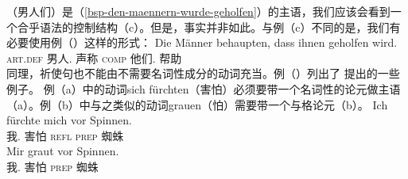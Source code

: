 （男人们）是（\ref{bsp-den-maennern-wurde-geholfen}）的主语，我们应该会看到一个合乎语法的控制结构（c）。但是，事实并非如此。与例（c）不同的是，我们有必要使用例（）这样的形式：
\ea
\gll Die Männer behaupten, dass ihnen geholfen wird.\\
	 \textsc{art}.\textsc{def} 男人.\nom{} 声称 \textsc{comp} 他们.\dat{} 帮助 \passiveprs\\
\z
%
同理，祈使句也不能由不需要名词性成分的动词充当。例（）列出了 \citet[]{Reis82}提出的一些例子。
\eal
{}
\zl
例（a）中的动词sich fürchten（害怕）必须要带一个名词性的论元做主语（a）。例（b）中与之类似的动词grauen（怕）需要带一个与格论元（b）。
\eal
\ex
\gll Ich fürchte mich vor Spinnen.\\
	 我.\nom{} 害怕 \textsc{refl} \textsc{prep} 蜘蛛\\
\ex 
\gll Mir graut vor Spinnen.\\
	 我.\dat{} 害怕 \textsc{prep} 蜘蛛\\
\zl

